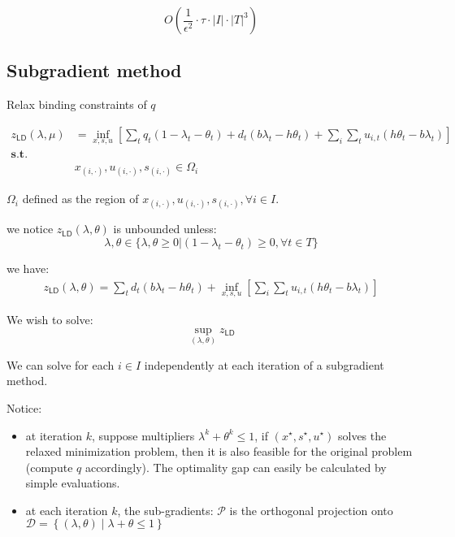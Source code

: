 \documentclass[
  a4paper,
,tablecaptionabove
]{scrartcl}
\numberwithin{equation}{section}
\providecommand{\tightlist}{%
  \setlength{\itemsep}{0pt}\setlength{\parskip}{0pt}}
\begin{document}
\[O\left(\frac{1}{\epsilon^2}\cdot\tau\cdot|I|\cdot|T|^3\right)\]

\hypertarget{subgradient-method}{%
\subsection{Subgradient method}\label{subgradient-method}}

Relax binding constraints of \(q\)

\[\begin{aligned}
  z_{\mathsf{LD}}(\lambda, \mu)& = \inf_{x, s, u} \left[ \sum_t 
      q_t (1-\lambda_t - \theta_t) + d_t(b\lambda_t -h \theta_t)
    + \sum_i \sum_t u_{i,t}(h\theta_t - b\lambda_t) \right] \\ 
  \mathbf {s.t. }  & \\
  & x_{(i,\cdot)}, u_{(i,\cdot)}, s_{(i,\cdot)} \in \Omega_i
\end{aligned}\]

\(\Omega_i\) defined as the region of
\(x_{(i,\cdot)}, u_{(i,\cdot)}, s_{(i,\cdot)}, \forall i\in I\).

we notice \(z_{\mathsf{LD}}(\lambda, \theta)\) is unbounded unless:
\[\lambda, \theta \in \{\lambda, \theta \ge 0 \big | (1-\lambda_t - \theta_t) \ge 0,\forall t\in T\}\]

we have: \[\begin{aligned}
z_{\mathsf{LD}}(\lambda, \theta) = \sum_t 
      d_t(b\lambda_t -h \theta_t) + \inf_{x, s, u} \left[  \sum_i \sum_t u_{i,t}(h\theta_t - b\lambda_t) \right]
\end{aligned}\]

We wish to solve: \[\sup_{(\lambda, \theta)}z_{\mathsf{LD}}\]

We can solve for each \(i\in I\) independently at each iteration of a
subgradient method.

Notice:

\begin{itemize}
\tightlist
\item
  at iteration \(k\), suppose multipliers
  \(\lambda^k + \theta^k \le 1\), if \(( x^\star, s^\star, u^\star)\)
  solves the relaxed minimization problem, then it is also feasible for
  the original problem (compute \(q\) accordingly). The optimality gap
  can easily be calculated by simple evaluations.
\item
  at each iteration \(k\), the sub-gradients: \(\mathcal P\) is the
  orthogonal projection onto
  \(\mathcal D =\left\{(\lambda, \theta) \;| \; \lambda + \theta \le 1\right\}\)
\end{itemize}
\end{document}
